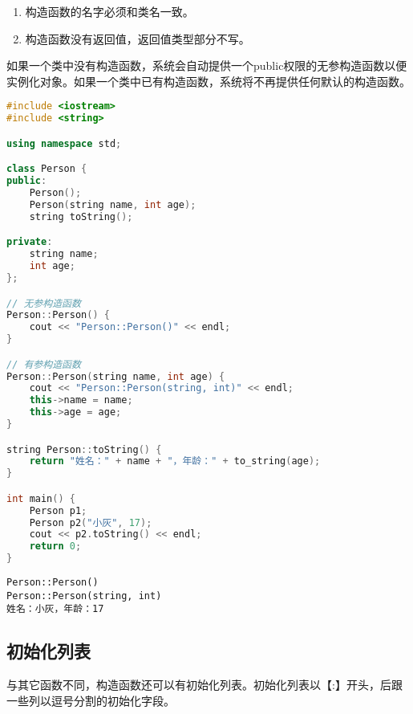 \begin{enumerate}
	\item 构造函数的名字必须和类名一致。
	\item 构造函数没有返回值，返回值类型部分不写。
\end{enumerate}

如果一个类中没有构造函数，系统会自动提供一个public权限的无参构造函数以便实例化对象。如果一个类中已有构造函数，系统将不再提供任何默认的构造函数。\\


\begin{lstlisting}[language=C++]
#include <iostream>
#include <string>

using namespace std;

class Person {
public:
    Person();
    Person(string name, int age);
    string toString();

private:
    string name;
    int age;
};

// 无参构造函数
Person::Person() {
    cout << "Person::Person()" << endl;
}

// 有参构造函数
Person::Person(string name, int age) {
    cout << "Person::Person(string, int)" << endl;
    this->name = name;
    this->age = age;
}

string Person::toString() {
    return "姓名：" + name + "，年龄：" + to_string(age);
}

int main() {
    Person p1;
    Person p2("小灰", 17);
    cout << p2.toString() << endl;
    return 0;
}
\end{lstlisting}

\begin{tcolorbox}
	\begin{verbatim}
Person::Person()
Person::Person(string, int)
姓名：小灰，年龄：17
	\end{verbatim}
\end{tcolorbox}

\vspace{0.5cm}

\subsection{初始化列表}

与其它函数不同，构造函数还可以有初始化列表。初始化列表以【:】开头，后跟一些列以逗号分割的初始化字段。\\


